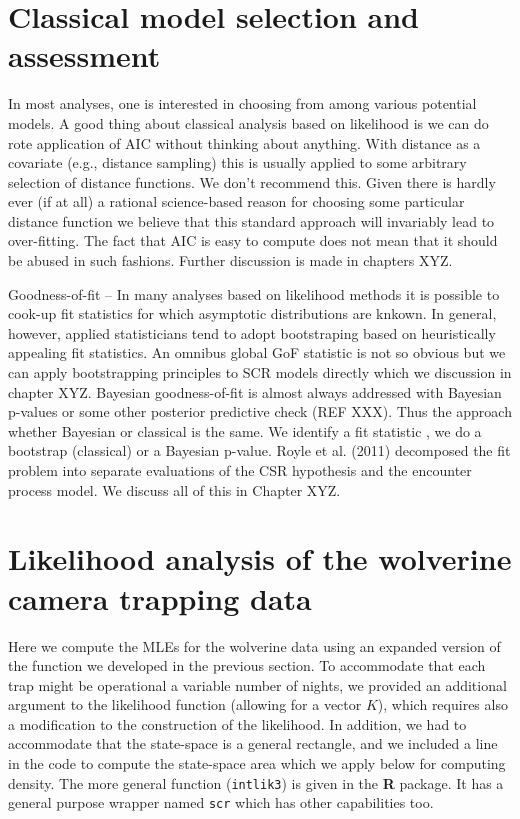 \section{Classical model selection and assessment}

In most analyses, one is interested in choosing from among various
potential models. A good thing about classical analysis based on
likelihood is we can do rote application of AIC without thinking about
anything. With distance as a covariate (e.g., distance sampling) this
is usually applied to some arbitrary selection of distance
functions. We don’t recommend this. Given there is hardly ever (if at
all) a rational science-based reason for choosing some particular
distance function we believe that this standard approach will
invariably lead to over-fitting. The fact that AIC is easy to compute
does not mean that it should be abused in such fashions. Further
discussion is made in chapters XYZ.

Goodness-of-fit – In many analyses based on likelihood methods it is
possible to cook-up fit statistics for which asymptotic distributions
are knkown. In general, however, applied statisticians tend to adopt
bootstraping based on heuristically appealing fit statistics. An
omnibus global GoF statistic is not so obvious but we can apply
bootstrapping principles to SCR models directly which we discussion in
chapter XYZ.  Bayesian goodness-of-fit is almost always addressed with
Bayesian p-values or some other posterior predictive check (REF
XXX). Thus the approach whether Bayesian or classical is the same. We
identify a fit statistic , we do a bootstrap (classical) or a Bayesian
p-value.  Royle et al. (2011) decomposed the fit problem into separate
evaluations of the CSR hypothesis and the encounter process model. We
discuss all of this in Chapter XYZ.


\section{Likelihood analysis of the wolverine camera trapping data}
\label{mle.sec.wolverine}

Here we compute the MLEs for the wolverine data using an expanded
version of the function we developed in the previous section. To
accommodate that each trap might be operational a variable number of
nights, we provided an additional argument to the likelihood function
(allowing for a vector $K$), which requires also a modification to the
construction of the likelihood.  In addition,
we had to accommodate that the state-space is a general rectangle, and
we included a line in the code to compute the state-space area which
we apply below for computing density.  The more general function
(\mbox{\tt intlik3}) is given in the {\bf R} package. It has a general
purpose wrapper named \mbox{\tt scr} which has other capabilities too. 

